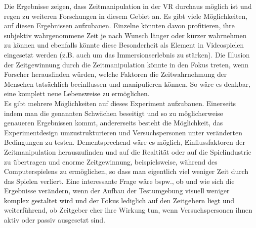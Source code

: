 \documentclass{Paper}
\begin{document}
Die Ergebnisse zeigen, dass Zeitmanipulation in der VR durchaus möglich ist und regen zu weiteren Forschungen in diesem Gebiet an. Es gibt viele Möglichkeiten, auf diesen Ergebnissen aufzubauen.
Einzelne könnten davon profitieren, ihre subjektiv wahrgenommene Zeit je nach Wunsch länger oder kürzer wahrnehmen zu können und ebenfalls könnte diese Besonderheit als Element in Videospielen eingesetzt werden (z.B. auch um das Immersionserlebnis zu stärken). Die Illusion der Zeitgewinnung durch die Zeitmanipulation könnte in den Fokus treten, wenn Forscher herausfinden würden, welche Faktoren die Zeitwahrnehmung der Menschen tatsächlich beeinflussen und manipulieren können. So wäre es denkbar, eine komplett neue Lebensweise zu ermöglichen.   \\
Es gibt mehrere Möglichkeiten auf dieses Experiment aufzubauen. Einerseits indem man die genannten Schwächen beseitigt und so zu möglicherweise genaueren Ergebnissen kommt, andererseits besteht die Möglichkeit, das Experimentdesign umzustrukturieren und Versuchspersonen unter veränderten Bedingungen zu testen. Dementsprechend wäre es möglich, Einflussfaktoren der Zeitmanipulation herauszufinden und auf die Realtität oder auf die Spielindustrie zu übertragen und enorme Zeitgewinnung, beispielsweise, während des Computerspielens zu ermöglichen, so dass man eigentlich viel weniger Zeit durch das Spielen verliert. 
Eine interessante Frage wäre bspw., ob und wie sich die Ergebnisse verändern, wenn der Aufbau der Testumgebung visuell weniger komplex gestaltet wird und der Fokus lediglich auf den Zeitgebern liegt und weiterführend, ob Zeitgeber eher ihre Wirkung tun, wenn Versuchspersonen ihnen aktiv oder passiv ausgesetzt sind.\\







\newpage

\printbibliography
\end{document}
